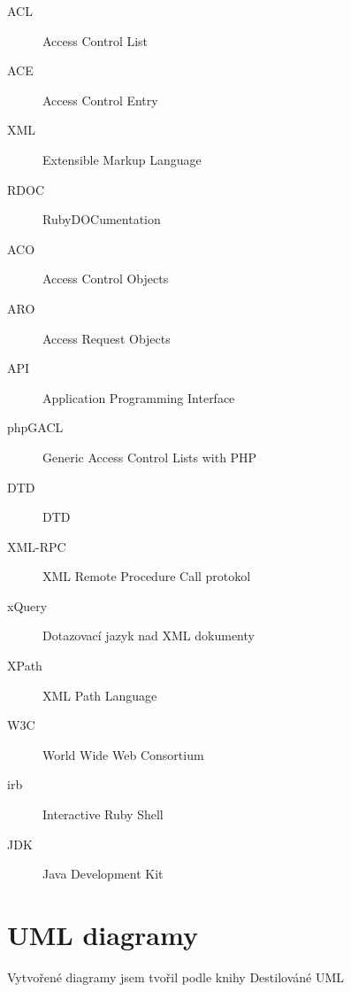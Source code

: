 \documentclass[11pt,twoside,a4paper]{book}
\begin{document}
\begin{description}
\item[ACL] Access Control List
\item[ACE] Access Control Entry
\item[XML] Extensible Markup Language
\item[RDOC] RubyDOCumentation
\item[ACO] Access Control Objects
\item[ARO] Access Request Objects
\item[API] Application Programming Interface
\item[phpGACL] Generic Access Control Lists with PHP
\item[DTD] DTD
\item[XML-RPC] XML Remote Procedure Call protokol
\item[xQuery] Dotazovací jazyk nad XML dokumenty
\item[XPath] XML Path Language
\item[W3C] World Wide Web Consortium
\item[irb] Interactive Ruby Shell
\item[JDK] Java Development Kit
\end{description}

\chapter{UML diagramy}

Vytvořené diagramy jsem tvořil podle knihy Destilováné UML \cite{UML}
\end{document}
